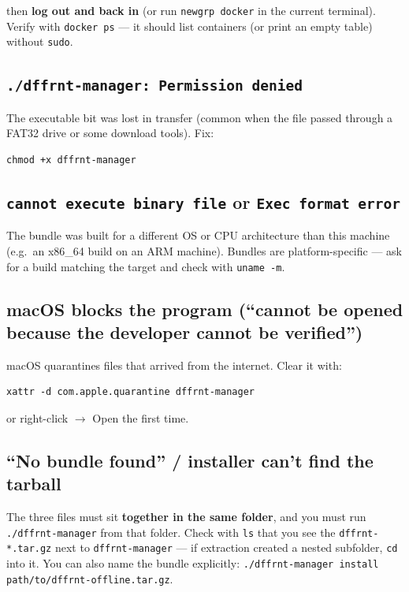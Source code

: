 \documentclass[11pt,letterpaper]{article}
\begin{document}
then \textbf{log out and back in} (or run \texttt{newgrp docker} in the
current terminal). Verify with \texttt{docker ps} --- it should list
containers (or print an empty table) without \texttt{sudo}.

\subsection{\texttt{./dffrnt-manager: Permission denied}}

The executable bit was lost in transfer (common when the file passed through
a FAT32 drive or some download tools). Fix:

\begin{lstlisting}
chmod +x dffrnt-manager
\end{lstlisting}

\subsection{\texttt{cannot execute binary file} or \texttt{Exec format error}}

The bundle was built for a different OS or CPU architecture than this machine
(e.g.\ an x86\_64 build on an ARM machine). Bundles are platform-specific ---
ask for a build matching the target and check with \texttt{uname -m}.

\subsection{macOS blocks the program (``cannot be opened because the developer cannot be verified'')}

macOS quarantines files that arrived from the internet. Clear it with:

\begin{lstlisting}
xattr -d com.apple.quarantine dffrnt-manager
\end{lstlisting}

or right-click $\rightarrow$ Open the first time.

\subsection{``No bundle found'' / installer can't find the tarball}

The three files must sit \textbf{together in the same folder}, and you must
run \texttt{./dffrnt-manager} from that folder. Check with \texttt{ls} that
you see the \texttt{dffrnt-*.tar.gz} next to \texttt{dffrnt-manager} --- if
extraction created a nested subfolder, \texttt{cd} into it. You can also name
the bundle explicitly:
\texttt{./dffrnt-manager install path/to/dffrnt-offline.tar.gz}.
\end{document}

